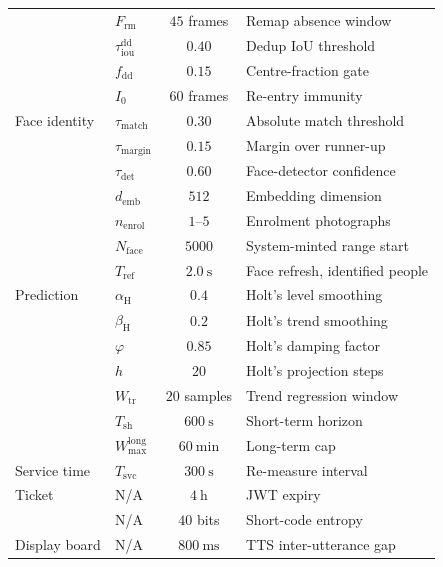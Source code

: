\begin{table}[!htbp]
\begin{tabular}{llcl}
                & $F_{\mathrm{rm}}$            & $45$ frames          & Remap absence window \\
                & $\tau_{\mathrm{iou}}^{\mathrm{dd}}$ & $0.40$   & Dedup IoU threshold \\
                & $f_{\mathrm{dd}}$            & $0.15$               & Centre-fraction gate \\
                & $I_0$                        & $60$ frames          & Re-entry immunity \\
\hline
Face identity   & $\tau_{\mathrm{match}}$      & $0.30$               & Absolute match threshold \\
                & $\tau_{\mathrm{margin}}$     & $0.15$               & Margin over runner-up \\
                & $\tau_{\mathrm{det}}$        & $0.60$               & Face-detector confidence \\
                & $d_{\mathrm{emb}}$           & $512$                & Embedding dimension \\
                & $n_{\mathrm{enrol}}$         & $1$--$5$             & Enrolment photographs \\
                & $N_{\mathrm{face}}$          & $5000$               & System-minted range start \\
                & $T_{\mathrm{ref}}$           & $2.0\ \mathrm{s}$    & Face refresh, identified people \\
\hline
Prediction      & $\alpha_{\mathrm{H}}$        & $0.4$                & Holt's level smoothing \\
                & $\beta_{\mathrm{H}}$         & $0.2$                & Holt's trend smoothing \\
                & $\varphi$                    & $0.85$               & Holt's damping factor \\
                & $h$                          & $20$                 & Holt's projection steps \\
                & $W_{\mathrm{tr}}$            & $20$ samples         & Trend regression window \\
                & $T_{\mathrm{sh}}$            & $600\ \mathrm{s}$    & Short-term horizon \\
                & $W_{\max}^{\text{long}}$     & $60\ \mathrm{min}$   & Long-term cap \\
\hline
Service time    & $T_{\mathrm{svc}}$           & $300\ \mathrm{s}$    & Re-measure interval \\
\hline
Ticket          & N/A                          & $4\ \mathrm{h}$      & JWT expiry \\
                & N/A                          & $40$ bits            & Short-code entropy \\
\hline
Display board   & N/A                          & $800\ \mathrm{ms}$   & TTS inter-utterance gap \\
\hline
\end{tabular}
\end{table}

